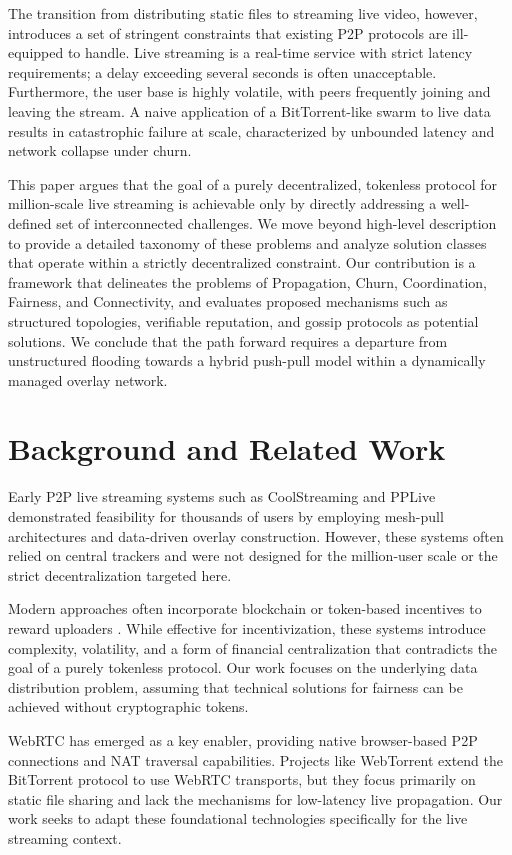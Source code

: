 \documentclass[journal]{IEEEtran}
\begin{document}
The transition from distributing static files to streaming live video, however, introduces a set of stringent constraints that existing P2P protocols are ill-equipped to handle. Live streaming is a real-time service with strict latency requirements; a delay exceeding several seconds is often unacceptable. Furthermore, the user base is highly volatile, with peers frequently joining and leaving the stream. A naive application of a BitTorrent-like swarm to live data results in catastrophic failure at scale, characterized by unbounded latency and network collapse under churn.

This paper argues that the goal of a purely decentralized, tokenless protocol for million-scale live streaming is achievable only by directly addressing a well-defined set of interconnected challenges. We move beyond high-level description to provide a detailed taxonomy of these problems and analyze solution classes that operate within a strictly decentralized constraint. Our contribution is a framework that delineates the problems of Propagation, Churn, Coordination, Fairness, and Connectivity, and evaluates proposed mechanisms such as structured topologies, verifiable reputation, and gossip protocols as potential solutions. We conclude that the path forward requires a departure from unstructured flooding towards a hybrid push-pull model within a dynamically managed overlay network.

\section{Background and Related Work}
Early P2P live streaming systems such as CoolStreaming \cite{zhang2005coolstreaming} and PPLive \cite{pplive2005} demonstrated feasibility for thousands of users by employing mesh-pull architectures and data-driven overlay construction. However, these systems often relied on central trackers and were not designed for the million-user scale or the strict decentralization targeted here.

Modern approaches often incorporate blockchain or token-based incentives to reward uploaders \cite{livepeer2023}. While effective for incentivization, these systems introduce complexity, volatility, and a form of financial centralization that contradicts the goal of a purely tokenless protocol. Our work focuses on the underlying data distribution problem, assuming that technical solutions for fairness can be achieved without cryptographic tokens.

WebRTC has emerged as a key enabler, providing native browser-based P2P connections and NAT traversal capabilities. Projects like WebTorrent \cite{webtorrent} extend the BitTorrent protocol to use WebRTC transports, but they focus primarily on static file sharing and lack the mechanisms for low-latency live propagation. Our work seeks to adapt these foundational technologies specifically for the live streaming context.
\end{document}
